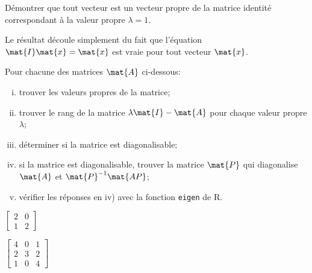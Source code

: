 \begin{exercice}
  Démontrer que tout vecteur est un vecteur propre de la matrice
  identité correspondant à la valeur propre $\lambda = 1$.
  \begin{sol}
    Le résultat découle simplement du fait que l'équation $\mat{I}
    \mat{x} = \mat{x}$ est vraie pour tout vecteur $\mat{x}$.
  \end{sol}
\end{exercice}

\begin{exercice}
  Pour chacune des matrices $\mat{A}$ ci-dessous:
  \begin{enumerate}[i)]
  \item trouver les valeurs propres de la matrice;
  \item trouver le rang de la matrice $\lambda \mat{I} - \mat{A}$ pour
    chaque valeur propre $\lambda$;
  \item déterminer si la matrice est diagonalisable;
  \item si la matrice est diagonalisable, trouver la matrice $\mat{P}$
    qui diagonalise $\mat{A}$ et $\mat{P}^{-1} \mat{AP}$;
  \item vérifier les réponses en iv) avec la fonction \texttt{eigen}
    de R.
  \end{enumerate}
  \begin{enumerate}
    \begin{multicols}{2}
    \item $\begin{bmatrix} 2 & 0 \\ 1 & 2 \end{bmatrix}$
    \item $\begin{bmatrix}
        4 &  0 &  1 \\
        2 &  3 &  2 \\
        1 & 0 & 4
      \end{bmatrix}$
    \end{multicols}
\end{enumerate}
\end{exercice}
